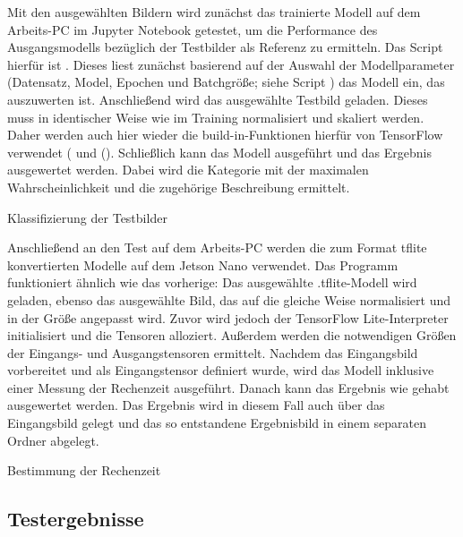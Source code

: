Mit den ausgewählten Bildern wird zunächst das trainierte Modell auf dem Arbeits-PC im Jupyter Notebook getestet, um die Performance des Ausgangsmodells bezüglich der Testbilder als Referenz zu ermitteln. Das Script hierfür ist . Dieses liest zunächst basierend auf der Auswahl der Modellparameter (Datensatz, Model,
Epochen und Batchgröße; siehe Script ) das Modell ein, das auszuwerten ist. Anschließend wird das ausgewählte Testbild geladen. Dieses muss in identischer Weise wie im Training normalisiert und skaliert werden. Daher werden auch hier wieder die build-in-Funktionen hierfür von TensorFlow verwendet ( und ().
Schließlich kann das Modell ausgeführt und das Ergebnis ausgewertet werden. Dabei wird die Kategorie mit der maximalen Wahrscheinlichkeit und die zugehörige Beschreibung ermittelt.

\begin{code}
  
  \caption{Klassifizierung der Testbilder}
\end{code}  

Anschließend an den Test auf dem Arbeits-PC werden die zum Format tflite konvertierten Modelle auf dem Jetson Nano verwendet. Das Programm  funktioniert ähnlich wie das vorherige:
Das ausgewählte .tflite-Modell wird geladen, ebenso das ausgewählte Bild, das auf die gleiche Weise normalisiert und in der Größe
angepasst wird. Zuvor wird jedoch der TensorFlow Lite-Interpreter initialisiert und die Tensoren alloziert. Außerdem werden die notwendigen Größen der Eingangs- und Ausgangstensoren ermittelt. Nachdem das Eingangsbild vorbereitet und als Eingangstensor definiert wurde, wird das Modell inklusive einer Messung der Rechenzeit ausgeführt. Danach kann das Ergebnis wie gehabt ausgewertet werden. Das Ergebnis wird in diesem Fall auch über das Eingangsbild gelegt und das so entstandene Ergebnisbild in einem
separaten Ordner abgelegt.

\begin{code}
  
  \caption{Bestimmung der Rechenzeit}
\end{code}  


\subsection{Testergebnisse}

